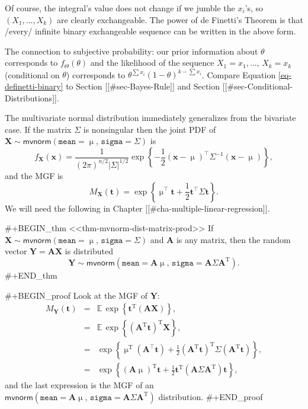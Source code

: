 Of course, the integral's value does not change if we jumble the
\(x_{i}\)'s, so \((X_{1},\ldots,X_{k})\) are clearly exchangeable. The
power of de Finetti's Theorem is that /every/ infinite binary
exchangeable sequence can be written in the above form.

The connection to subjective probability: our prior information about
\(\theta\) corresponds to \(f_{\Theta}(\theta)\) and the likelihood of
the sequence \(X_{1}=x_{1},\ldots,\, X_{k}=x_{k}\) (conditional on
\(\theta\)) corresponds to \(\theta^{\sum x_{i}}(1-\theta)^{k-\sum
x_{i}}\). Compare Equation \eqref{eq-definetti-binary} to Section
[[#sec-Bayes-Rule]] and Section [[#sec-Conditional-Distributions]].

The multivariate normal distribution immediately generalizes from the
bivariate case. If the matrix \(\Sigma\) is nonsingular then the joint
PDF of
\(\mathbf{X}\sim\mathsf{mvnorm}(\mathtt{mean}=\upmu,\,\mathtt{sigma}=\Sigma)\)
is
\begin{equation}
f_{\mathbf{X}}(\mathbf{x})=\frac{1}{(2\pi)^{n/2}\left|\Sigma\right|^{1/2}}\exp\left\{ -\frac{1}{2}\left(\mathbf{x}-\upmu\right)^{\top}\Sigma^{-1}\left(\mathbf{x}-\upmu\right)\right\},
\end{equation}
and the MGF is
\begin{equation}
M_{\mathbf{X}}(\mathbf{t})=\exp\left\{ \upmu^{\top}\mathbf{t}+\frac{1}{2}\mathbf{t}^{\top}\Sigma\mathbf{t}\right\}.
\end{equation}
We will need the following in Chapter [[#cha-multiple-linear-regression]].

#+BEGIN_thm
<<thm-mvnorm-dist-matrix-prod>> If \(\mathbf{X} \sim
\mathsf{mvnorm}(\mathtt{mean} = \upmu, \, \mathtt{sigma} = \Sigma)\)
and \(\mathbf{A}\) is any matrix, then the random vector
\(\mathbf{Y}=\mathbf{AX}\) is distributed
\begin{equation}
\mathbf{Y}\sim\mathsf{mvnorm}(\mathtt{mean}=\mathbf{A}\upmu,\,\mathtt{sigma}=\mathbf{A}\Sigma\mathbf{A}^{\mathrm{T}}).
\end{equation}
#+END_thm

#+BEGIN_proof
Look at the MGF of \(\mathbf{Y}\):
\begin{eqnarray*}
M_{\mathbf{Y}}(\mathbf{t}) & = & \mathbb{E}\,\exp\left\{ \mathbf{t}^{\mathrm{T}}(\mathbf{AX})\right\} ,\\
 & = & \mathbb{E}\,\exp\left\{ (\mathbf{A}^{\mathrm{T}}\mathbf{t})^{\mathrm{T}}\mathbf{X}\right\} ,\\
 & = & \exp\left\{ \upmu^{\mathrm{T}}(\mathbf{A}^{\top}\mathbf{t})+\frac{1}{2}(\mathbf{A}^{\mathrm{T}}\mathbf{t})^{\mathrm{T}}\Sigma(\mathbf{A}^{\mathrm{T}}\mathbf{t})\right\} ,\\
 & = & \exp\left\{ \left(\mathbf{A}\upmu\right)^{\mathrm{T}}\mathbf{t}+\frac{1}{2}\mathbf{t}^{\mathrm{T}}\left(\mathbf{A}\Sigma\mathbf{A}^{\mathrm{T}}\right)\mathbf{t}\right\},
\end{eqnarray*}
and the last expression is the MGF of an
\(\mathsf{mvnorm}(\mathtt{mean}=\mathbf{A}\upmu,\,\mathtt{sigma}=\mathbf{A}\Sigma\mathbf{A}^{\mathrm{T}})\)
distribution.
#+END_proof

